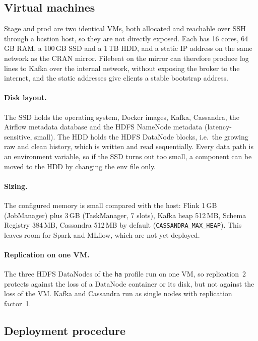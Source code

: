 \documentclass[11pt,a4paper]{article}
\begin{document}
\subsection{Virtual machines}

Stage and prod are two identical VMs, both allocated and reachable over SSH through a bastion host, so they are not directly exposed.
Each has 16 cores, 64\,GB RAM, a 100\,GB SSD and a 1\,TB HDD, and a static IP address on the same network as the CRAN mirror.
Filebeat on the mirror can therefore produce log lines to Kafka over the internal network, without exposing the broker to the
internet, and the static addresses give clients a stable bootstrap address.

\paragraph*{Disk layout.} The SSD holds the operating system, Docker images, Kafka, Cassandra, the Airflow metadata database and the HDFS NameNode
metadata (latency-sensitive, small). The HDD holds the HDFS DataNode blocks, i.e.\ the growing raw and clean history, which is written and
read sequentially. Every data path is an environment variable, so if the SSD turns out too small, a component can be moved to the HDD by
changing the env file only.

\paragraph*{Sizing.} The configured memory is small compared with the host: Flink 1\,GB (JobManager) plus 3\,GB (TaskManager, 7 slots),
Kafka heap 512\,MB, Schema Registry 384\,MB, Cassandra 512\,MB by default (\texttt{CASSANDRA\_MAX\_HEAP}). This leaves room for Spark and MLflow, which are not yet deployed.

\paragraph*{Replication on one VM.} The three HDFS DataNodes of the \texttt{ha} profile run on one VM, so replication~2 protects against
the loss of a DataNode container or its disk, but not against the loss of the VM. Kafka and Cassandra run as single nodes with replication factor~1.

\subsection{Deployment procedure}
\end{document}
